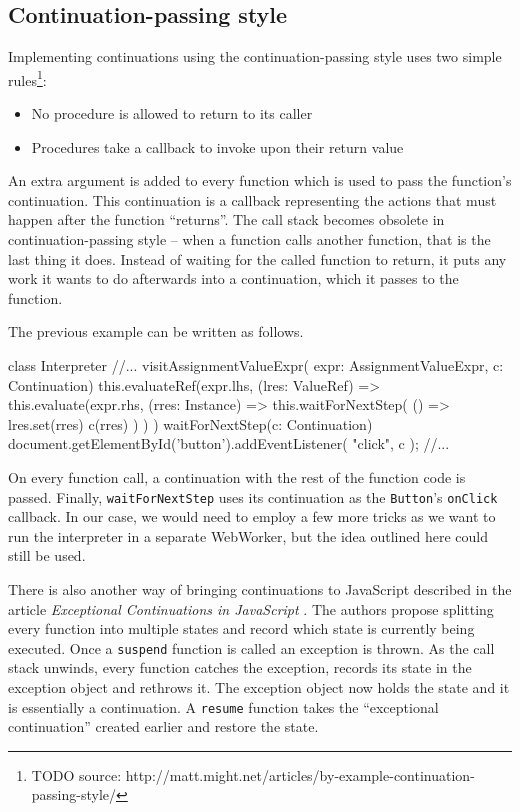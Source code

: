 \subsection*{Continuation-passing style}
\label{chap4:continuations}
Implementing continuations using the continuation-passing style uses two simple rules\footnote{TODO source: http://matt.might.net/articles/by-example-continuation-passing-style/}:
\begin{itemize}
    \item No procedure is allowed to return to its caller
    \item Procedures take a callback to invoke upon their return value
\end{itemize}
An extra argument is added to every function which is used to pass the function's continuation. This continuation is a callback
representing the actions that must happen after the function ``returns''. The call stack becomes obsolete in continuation-passing style -- when
a function calls another function, that is the last thing it does. Instead of waiting for the called function to return, it puts any work
it wants to do afterwards into a continuation, which it passes to the function.

The previous example can be written as follows.
\begin{code}
class Interpreter {
    //...
    visitAssignmentValueExpr(
        expr: AssignmentValueExpr, c: Continuation) {
        this.evaluateRef(expr.lhs, (lres: ValueRef) => {
            this.evaluate(expr.rhs, (rres: Instance) => {
                this.waitForNextStep(
                    () => {
                        lres.set(rres)
                        c(rres)
                })
            })
        })
    }
    waitForNextStep(c: Continuation) {
        document.getElementById('button').addEventListener(
            "click",
            c
        );
    }
    //...
}
\end{code}

On every function call, a continuation with the rest of the function code is passed. Finally, \texttt{waitForNextStep} uses its continuation as the \texttt{Button}'s
\texttt{onClick} callback. In our case, we would need to employ a few more tricks as we want to run the interpreter in a separate WebWorker, but the idea
outlined here could still be used.

There is also another way of bringing continuations to JavaScript described in the article \emph{Exceptional Continuations in JavaScript} \cite{ExceptionalContinuations}. The authors
propose splitting every function into multiple states and record which state is currently being executed. Once a \texttt{suspend} function is called an exception
is thrown. As the call stack unwinds, every function catches the exception, records its state in the exception object and rethrows it. The exception object now holds the state and it is
essentially a continuation. A \texttt{resume} function takes the ``exceptional continuation'' created earlier and restore the state.

